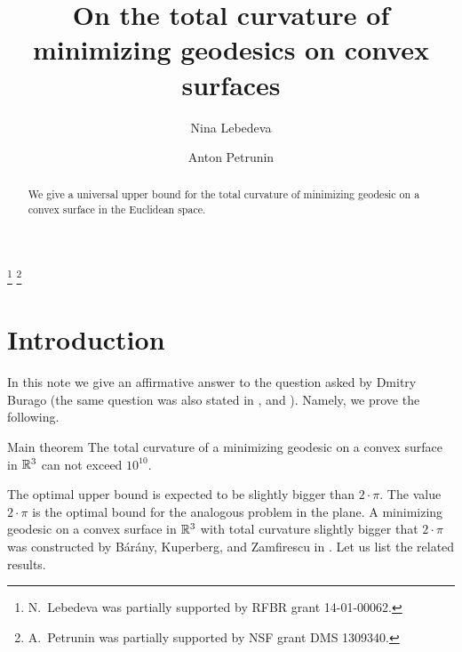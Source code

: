 \documentclass[a4paper,10pt]{amsart}
\begin{document}
\title{On the total curvature of \\
minimizing geodesics on convex surfaces}
\author{Nina Lebedeva}
\address{N. Lebedeva\newline\vskip-4mm
Math. Dept.
St. Petersburg State University,
Universitetsky pr., 28, 
Stary Peterhof, 
198504, Russia.
\newline\vskip-4mm
Steklov Institute,
27 Fontanka, St. Petersburg, 
191023, Russia.}
\author{Anton Petrunin}
\address{A. Petrunin\newline\vskip-4mm
Math. Dept. PSU,
University Park, PA 16802,
USA}
\thanks{N.~Lebedeva was partially supported by RFBR grant 
14-01-00062.}
\thanks{A.~Petrunin was partially supported by NSF grant DMS 1309340.}


\date{}

\begin{abstract}
We give a universal upper bound 
for the total curvature 
of minimizing geodesic 
on a convex surface 
in the Euclidean space.
\end{abstract}
\maketitle

\section{Introduction}

In this note we give an affirmative answer to the question asked by Dmitry Burago (the same question was also stated in \cite{AH-PSV}, \cite{pach} and \cite{BKZ}).
Namely, we prove the following.

\begin{thm}{Main theorem}\label{thm:main}
The total curvature of a minimizing geodesic
on a convex surface in $\mathbb{R}^3$ can not exceed $10^{10}$.
\end{thm}

The optimal upper bound is expected to be slightly bigger than $2\cdot\pi$.
The value $2\cdot\pi$ is the optimal bound for the analogous problem in the plane.
A minimizing geodesic on a convex surface in $\mathbb{R}^3$
with total curvature slightly bigger that $2\cdot\pi$ was constructed by 
B{\'a}r{\'a}ny,
Kuperberg, 
and Zamfirescu in \cite{BKZ}.
Let us list the related results.
\end{document}
